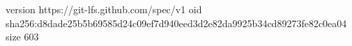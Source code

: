 version https://git-lfs.github.com/spec/v1
oid sha256:d8dade25b5b69585d24c09ef7d940eed3d2e82da9925b34cd89273fe82c0ea04
size 603
